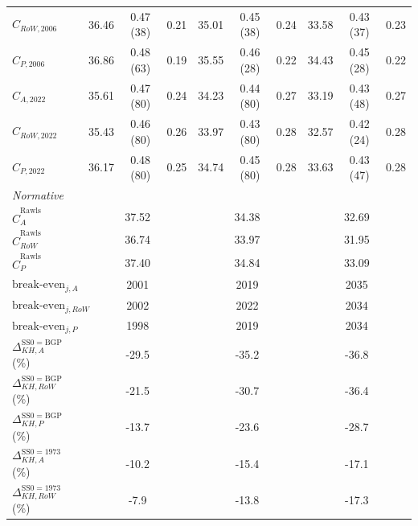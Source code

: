 \begin{table}[htbp]
\begin{tabular}{l ccc ccc ccc}
\(C_{RoW,2006}\) & 36.46 & 0.47 (38) & 0.21 & 35.01 & 0.45 (38) & 0.24 & 33.58 & 0.43 (37) & 0.23 \\
\(C_{P,2006}\) & 36.86 & 0.48 (63) & 0.19 & 35.55 & 0.46 (28) & 0.22 & 34.43 & 0.45 (28) & 0.22 \\
\(C_{A,2022}\) & 35.61 & 0.47 (80) & 0.24 & 34.23 & 0.44 (80) & 0.27 & 33.19 & 0.43 (48) & 0.27 \\
\(C_{RoW,2022}\) & 35.43 & 0.46 (80) & 0.26 & 33.97 & 0.43 (80) & 0.28 & 32.57 & 0.42 (24) & 0.28 \\
\(C_{P,2022}\) & 36.17 & 0.48 (80) & 0.25 & 34.74 & 0.45 (80) & 0.28 & 33.63 & 0.43 (47) & 0.28 \\
\addlinespace
\textit{Normative} & \multicolumn{3}{c}{} & \multicolumn{3}{c}{} & \multicolumn{3}{c}{} \\
\midrule
\(\hat{C}^{\mathrm{Rawls}}_{A}\) & \multicolumn{3}{c}{37.52} & \multicolumn{3}{c}{34.38} & \multicolumn{3}{c}{32.69} \\
\(\hat{C}^{\mathrm{Rawls}}_{RoW}\) & \multicolumn{3}{c}{36.74} & \multicolumn{3}{c}{33.97} & \multicolumn{3}{c}{31.95} \\
\(\hat{C}^{\mathrm{Rawls}}_{P}\) & \multicolumn{3}{c}{37.40} & \multicolumn{3}{c}{34.84} & \multicolumn{3}{c}{33.09} \\
\(\text{break-even}_{j,A}\) & \multicolumn{3}{c}{2001} & \multicolumn{3}{c}{2019} & \multicolumn{3}{c}{2035} \\
\(\text{break-even}_{j,RoW}\) & \multicolumn{3}{c}{2002} & \multicolumn{3}{c}{2022} & \multicolumn{3}{c}{2034} \\
\(\text{break-even}_{j,P}\) & \multicolumn{3}{c}{1998} & \multicolumn{3}{c}{2019} & \multicolumn{3}{c}{2034} \\
\(\Delta_{KH,A}^{\mathrm{SS0=BGP}}\) (\%) & \multicolumn{3}{c}{-29.5} & \multicolumn{3}{c}{-35.2} & \multicolumn{3}{c}{-36.8} \\
\(\Delta_{KH,RoW}^{\mathrm{SS0=BGP}}\) (\%) & \multicolumn{3}{c}{-21.5} & \multicolumn{3}{c}{-30.7} & \multicolumn{3}{c}{-36.4} \\
\(\Delta_{KH,P}^{\mathrm{SS0=BGP}}\) (\%) & \multicolumn{3}{c}{-13.7} & \multicolumn{3}{c}{-23.6} & \multicolumn{3}{c}{-28.7} \\
\(\Delta_{KH,A}^{\mathrm{SS0=1973}}\) (\%) & \multicolumn{3}{c}{-10.2} & \multicolumn{3}{c}{-15.4} & \multicolumn{3}{c}{-17.1} \\
\(\Delta_{KH,RoW}^{\mathrm{SS0=1973}}\) (\%) & \multicolumn{3}{c}{-7.9} & \multicolumn{3}{c}{-13.8} & \multicolumn{3}{c}{-17.3} \\

\end{tabular}
\end{table}
